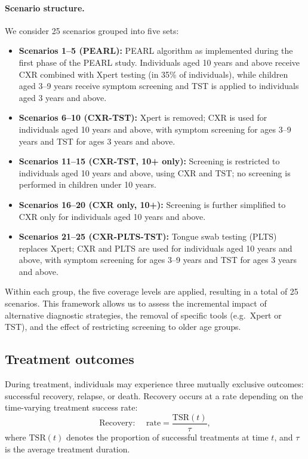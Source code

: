 \documentclass[11pt]{article}
\begin{document}
\paragraph{Scenario structure.}
We consider 25 scenarios grouped into five sets:

\begin{itemize}
    \item \textbf{Scenarios 1--5 (PEARL):} PEARL algorithm as implemented during the first phase of the PEARL study. Individuals aged 10 years and above receive CXR combined with Xpert testing (in 35\% of individuals), while children aged 3--9 years receive symptom screening and TST is applied to individuals aged 3 years and above.
    
    \item \textbf{Scenarios 6--10 (CXR-TST):} Xpert is removed; CXR is used for individuals aged 10 years and above, with symptom screening for ages 3--9 years and TST for ages 3 years and above.
    
    \item \textbf{Scenarios 11--15 (CXR-TST, 10+ only):} Screening is restricted to individuals aged 10 years and above, using CXR and TST; no screening is performed in children under 10 years.
    
    \item \textbf{Scenarios 16--20 (CXR only, 10+):} Screening is further simplified to CXR only for individuals aged 10 years and above.
    
    \item \textbf{Scenarios 21--25 (CXR-PLTS-TST):} Tongue swab testing (PLTS) replaces Xpert; CXR and PLTS are used for individuals aged 10 years and above, with symptom screening for ages 3--9 years and TST for ages 3 years and above.
\end{itemize}

Within each group, the five coverage levels are applied, resulting in a total of 25 scenarios. This framework allows us to assess the incremental impact of alternative diagnostic strategies, the removal of specific tools (e.g.\ Xpert or TST), and the effect of restricting screening to older age groups.

\subsection{Treatment outcomes}
During treatment, individuals may experience three mutually exclusive outcomes: successful recovery, relapse, or death. Recovery occurs at a rate depending on the time-varying treatment success rate:
\[
\text{Recovery: } \quad \text{rate} = \frac{\text{TSR}(t)}{\tau},
\]
where \(\text{TSR}(t)\) denotes the proportion of successful treatments at time \(t\), and \(\tau\) is the average treatment duration.  
\end{document}
